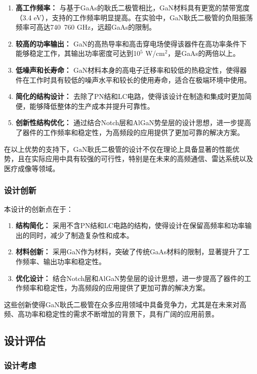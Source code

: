 \documentclass[12pt,hyperref,a4paper,UTF8]{ctexart}
\begin{document}
\begin{enumerate}
    \item \textbf{高工作频率：} 与基于GaAs的耿氏二极管相比，GaN材料具有更宽的禁带宽度（3.4 eV），支持的工作频率明显提高。在实验中，GaN耿氏二极管的负阻振荡频率可高达740~760 GHz，远超GaAs的限制。
    \item \textbf{较高的功率输出：} GaN的高热导率和高击穿电场使得该器件在高功率条件下能够稳定工作，其输出功率密度可达到10$^{5}$ W/cm$^2$，是GaAs的两倍以上。
    \item \textbf{低噪声和长寿命：} GaN材料本身的高电子迁移率和较低的热稳定性，使得器件在工作时具有较低的噪声水平和较长的使用寿命，适合在极端环境中使用。
    \item \textbf{简化的结构设计：} 去除了PN结和LC电路，使得该设计在制造和集成时更加简便，能够降低整体的生产成本并提升可靠性。
    \item \textbf{创新性结构优化：} 通过结合Notch层和AlGaN势垒层的设计思想，进一步提高了器件的工作频率和稳定性，为高频段的应用提供了更加可靠的解决方案。
\end{enumerate}

在以上优势的支持下，GaN耿氏二极管的设计不仅在理论上具备显著的性能优势，且在实际应用中具有较强的可行性，特别是在未来的高频通信、雷达系统以及医疗成像等领域。

\subsubsection*{设计创新}

本设计的创新点在于：
\begin{enumerate}
    \item \textbf{结构简化：} 采用不含PN结和LC电路的结构，使得设计在保留高频率和功率输出的同时，减少了制造复杂性和成本。
    \item \textbf{材料创新：} 采用GaN作为材料，突破了传统GaAs材料的限制，显著提升了工作频率、输出功率和稳定性。
    \item \textbf{优化设计：} 结合Notch层和AlGaN势垒层的设计思想，进一步提高了器件的工作频率和稳定性，为高频段的应用提供了更加可靠的解决方案。
\end{enumerate}

这些创新使得GaN耿氏二极管在众多应用领域中具备竞争力，尤其是在未来对高频、高功率和稳定性的需求不断增加的背景下，具有广阔的应用前景。
\subsection{设计评估}

\subsubsection*{设计考虑}
\end{document}
